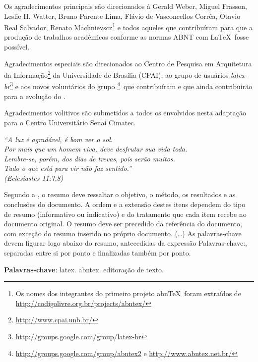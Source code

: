 \documentclass[
	12pt,				%
	openright,			%
	twoside,			%
	a4paper,			%
	english,			%
	french,				%
	spanish,			%
	brazil				%
	]{senai-cimatec-abntex2}
\begin{document}
\begin{agradecimentos}
	Os agradecimentos principais são direcionados à Gerald Weber, Miguel Frasson,
	Leslie H. Watter, Bruno Parente Lima, Flávio de Vasconcellos Corrêa, Otavio Real
	Salvador, Renato Machnievscz\footnote{Os nomes dos integrantes do primeiro
		projeto abn\TeX\ foram extraídos de
		\url{http://codigolivre.org.br/projects/abntex/}} e todos aqueles que
	contribuíram para que a produção de trabalhos acadêmicos conforme
	as normas ABNT com \LaTeX\ fosse possível.

	Agradecimentos especiais são direcionados ao Centro de Pesquisa em Arquitetura
	da Informação\footnote{\url{http://www.cpai.unb.br/}} da Universidade de
	Brasília (CPAI), ao grupo de usuários
	\emph{latex-br}\footnote{\url{http://groups.google.com/group/latex-br}} e aos
	novos voluntários do grupo
	\emph{\abnTeX}\footnote{\url{http://groups.google.com/group/abntex2} e
		\url{http://www.abntex.net.br/}}~que contribuíram e que ainda
	contribuirão para a evolução do \abnTeX.

	Agradecimentos volitivos são submetidos a todos os envolvidos nesta adaptação para o Centro Universitário Senai Cimatec.

\end{agradecimentos}

\begin{epigrafe}
	\vspace*{\fill}
	\begin{flushright}
		\textit{``A luz é agradável, é bom ver o sol.\\
			Por mais que um homem viva, deve desfrutar sua vida toda.\\ Lembre-se, porém, dos dias de trevas, pois serão muitos. \\ Tudo o que está para vir não faz sentido.''\\
			(Eclesiastes 11:7,8)}
	\end{flushright}
\end{epigrafe}

\setlength{\absparsep}{18pt} %
\begin{resumo}
	Segundo a , o resumo deve ressaltar o
	objetivo, o método, os resultados e as conclusões do documento. A ordem e a extensão destes itens dependem do tipo de resumo (informativo ou indicativo) e do tratamento que cada item recebe no documento original. O resumo deve ser precedido da referência do documento, com exceção do resumo inserido no próprio documento. (\ldots) As palavras-chave devem figurar logo abaixo do resumo, antecedidas da expressão Palavras-chave:, separadas entre si por ponto e finalizadas também por ponto.

	\textbf{Palavras-chave}: latex. abntex. editoração de texto.
\end{resumo}
\end{document}
